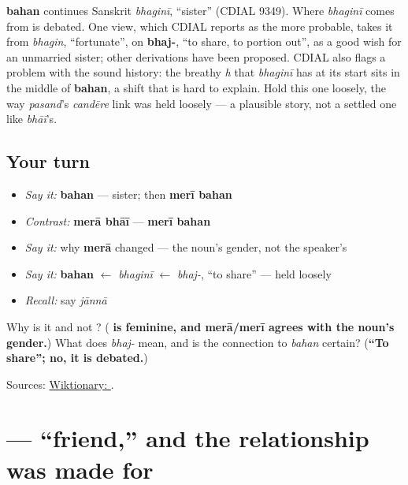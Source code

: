 \begin{cousinweb}
\textbf{bahan} continues Sanskrit \emph{bhaginī}, \textquotedblleft{}sister\textquotedblright{} (CDIAL 9349). Where \emph{bhaginī} comes from is debated. One view, which CDIAL reports as the more probable, takes it from \emph{bhagin}, \textquotedblleft{}fortunate\textquotedblright{}, on \textbf{bhaj-}, \textquotedblleft{}to share, to portion out\textquotedblright{}, as a good wish for an unmarried sister; other derivations have been proposed. CDIAL also flags a problem with the sound history: the breathy \emph{h} that \emph{bhaginī} has at its start sits in the middle of \textbf{bahan}, a shift that is hard to explain. Hold this one loosely, the way \emph{pasand}'s \emph{candēre} link was held loosely — a plausible story, not a settled one like \emph{bhāī}'s.
\end{cousinweb}

\subsection*{Your turn}
\begin{itemize}
\raggedright
  \item \emph{Say it:} \textbf{bahan} — sister; then \textbf{merī bahan}
  \item \emph{Contrast:} \textbf{merā bhāī} — \textbf{merī bahan}
  \item \emph{Say it:} why \textbf{merā} changed — the noun's gender, not the speaker's
  \item \emph{Say it:} \textbf{bahan} $\leftarrow$ \emph{bhaginī} $\leftarrow$ \emph{bhaj-}, \textquotedblleft{}to share\textquotedblright{} — held loosely
  \item \emph{Recall:} say \emph{jānnā}
\end{itemize}

\begin{tcolorbox}[breakable,colback=teal!4,colframe=teal!35!black,title={Before you move on}]
Why is it \textbf{ } and not \textbf{ }? (\textbf{ is feminine, and merā/merī agrees with the noun's gender.}) What does \emph{bhaj-} mean, and is the connection to \emph{bahan} certain? (\textbf{\textquotedblleft{}To share\textquotedblright{}; no, it is debated.})

Sources: \href{https://en.wiktionary.org/wiki/\%D8\%A8\%DB\%81\%D9\%86}{Wiktionary: }.
\end{tcolorbox}
\section[\texorpdfstring{\ur{دوست} (dost)}{دوست (dost)}]{ — \textquotedblleft{}friend,\textquotedblright{} and the relationship  was made for}

